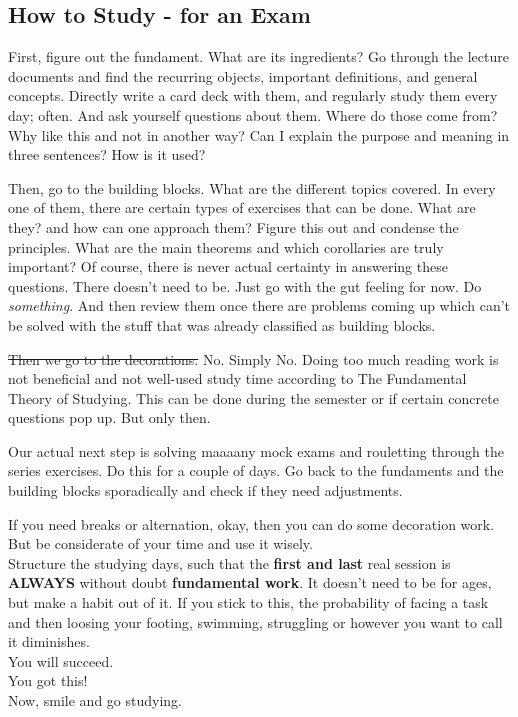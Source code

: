 \subsection{How to Study - for an Exam}
First, figure out the fundament. What are its ingredients? Go through the lecture documents and find the recurring objects, important definitions, and general concepts. Directly write a card deck with them, and regularly study them every day; often.
And ask yourself questions about them. Where do those come from? Why like this and not in another way? Can I explain the purpose and meaning in three sentences? How is it used?

Then, go to the building blocks. What are the different topics covered. In every one of them, there are certain types of exercises that can be done. What are they? and how can one approach them? Figure this out and condense the principles. What are the main theorems and which corollaries are truly important? Of course, there is never actual certainty in answering these questions. There doesn't need to be. Just go with the gut feeling for now. Do \textit{something}. And then review them once there are problems coming up which can't be solved with the stuff that was already classified as building blocks.

\st{Then we go to the decorations.} No. Simply No. Doing too much reading work is not beneficial and not well-used study time according to The Fundamental Theory of Studying. This can be done during the semester or if certain concrete questions pop up. But only then.

Our actual next step is solving maaaany mock exams and  rouletting through the series exercises. Do this for a couple of days. Go back to the fundaments and the building blocks sporadically and check if they need adjustments. 

If you need breaks or alternation, okay, then you can do some decoration work. But be considerate of your time and use it wisely. \\


Structure the studying days, such that the \textbf{first and last} real session is \textbf{ALWAYS} without doubt \textbf{fundamental work}. It doesn't need to be for ages, but make a habit out of it. If you stick to this, the probability of facing a task and then loosing your footing, swimming, struggling or however you want to call it diminishes.\\

You will succeed. \\

You got this! \\


Now, smile and go studying. \smiley{}
